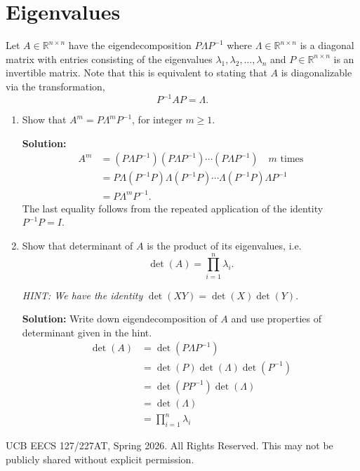 \documentclass[10pt]{article}
\newcommand{\RR}{\mathbb{R}}
\begin{document}
\newpage

\section{Eigenvalues}

Let $A \in \RR^{n \times n}$ have the eigendecomposition $P\Lambda P^{-1}$ where $\Lambda \in \RR^{n \times n}$ is a diagonal matrix with entries consisting of the eigenvalues $\lambda_1, \lambda_2, \ldots, \lambda_n$ and $P \in \RR^{n \times n}$ is an invertible matrix. Note that this is equivalent to stating that $A$ is diagonalizable via the transformation,
\begin{equation}
P^{-1}AP = \Lambda. \tag{10}
\end{equation}

\begin{enumerate}[label=(\alph*)]
\item Show that $A^m = P\Lambda^m P^{-1}$, for integer $m \geq 1$.

\textbf{Solution:}
\begin{align}
A^m &= (P\Lambda P^{-1})(P\Lambda P^{-1})\cdots(P\Lambda P^{-1}) \quad m \text{ times} \tag{11} \\
&= P\Lambda(P^{-1}P)\Lambda(P^{-1}P)\cdots\Lambda(P^{-1}P)\Lambda P^{-1} \tag{12} \\
&= P\Lambda^m P^{-1}. \tag{13}
\end{align}
The last equality follows from the repeated application of the identity $P^{-1}P = I$.

\item Show that determinant of $A$ is the product of its eigenvalues, i.e.
\begin{equation}
\det(A) = \prod_{i=1}^{n} \lambda_i. \tag{14}
\end{equation}

\textit{HINT: We have the identity} $\det(XY) = \det(X)\det(Y)$.

\textbf{Solution:} Write down eigendecomposition of $A$ and use properties of determinant given in the hint.
\begin{align}
\det(A) &= \det\!\left(P\Lambda P^{-1}\right) \tag{15} \\
&= \det(P)\det(\Lambda)\det\!\left(P^{-1}\right) \tag{16} \\
&= \det\!\left(PP^{-1}\right)\det(\Lambda) \tag{17} \\
&= \det(\Lambda) \tag{18} \\
&= \prod_{i=1}^{n} \lambda_i \tag{19}
\end{align}

\end{enumerate}

\vfill
\noindent\textcopyright{} UCB EECS 127/227AT, Spring 2026. All Rights Reserved. This may not be publicly shared without explicit permission.
\end{document}
